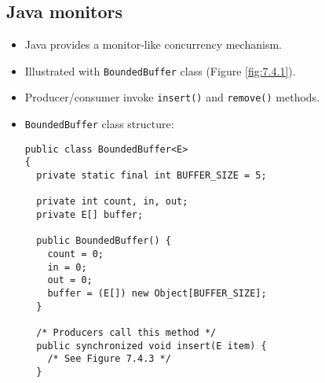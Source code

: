 \subsection{Java monitors}
\begin{itemize}
    \item Java provides a monitor-like concurrency mechanism.
    \item Illustrated with \texttt{BoundedBuffer} class (Figure \ref{fig:7.4.1}).
    \item Producer/consumer invoke \texttt{insert()} and \texttt{remove()} methods.
    \item \texttt{BoundedBuffer} class structure:
    \begin{verbatim}
public class BoundedBuffer<E>
{
  private static final int BUFFER_SIZE = 5;
 
  private int count, in, out;
  private E[] buffer;
 
  public BoundedBuffer() {
    count = 0;
    in = 0;
    out = 0;
    buffer = (E[]) new Object[BUFFER_SIZE];
  }
 
  /* Producers call this method */
  public synchronized void insert(E item) {
    /* See Figure 7.4.3 */
  }
 

\end{verbatim}
\end{itemize}
